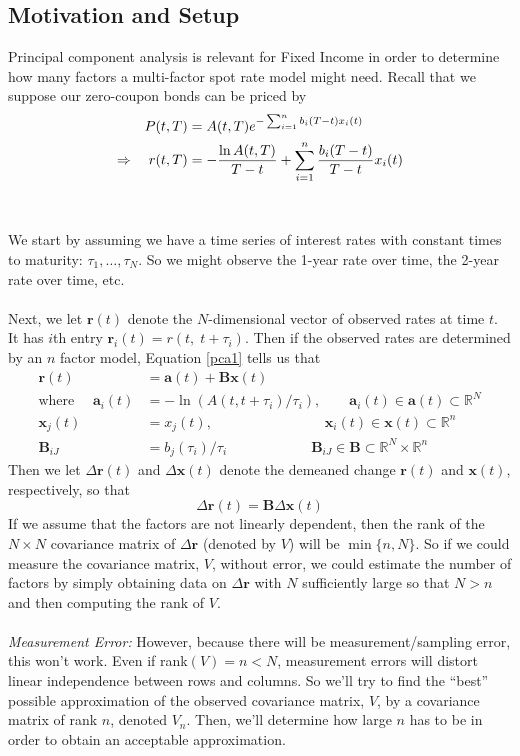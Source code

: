 \documentclass[a4paper,12pt]{scrartcl}
\begin{document}
\subsection{Motivation and Setup}
Principal component analysis is relevant for Fixed Income in 
order to determine how many factors a multi-factor spot rate
model might need. Recall that we suppose our zero-coupon bonds can
be priced by
\begin{align}
   \label{pca1}
   P(t,T) &= A(t,T) e^{-\sum^n_{i=1} b_i(T-t) x_i(t)} \notag\\
   \Rightarrow \quad r(t,T) &= -\frac{\ln A(t,T)}{T-t} + 
      \sum^n_{i=1} \frac{b_i(T-t)}{T-t} x_i(t)
\end{align}
\\
\\
We start by assuming  we have a time series of interest rates with
constant times to maturity: $\tau_1, \ldots, \tau_N$. So we might
observe the 1-year rate over time, the 2-year rate over time, etc.
\\
\\
Next, we let $\mathbf{r}(t)$ denote the $N$-dimensional vector of 
observed rates at time $t$. It has $i$th entry $\mathbf{r}_i(t) = 
r(t,\; t + \tau_i)$. Then if the observed rates are determined by
an $n$ factor model, Equation \ref{pca1} tells us that
\begin{align*}
   \mathbf{r}(t) &= \mathbf{a}(t) + \mathbf{B}\mathbf{x}(t)\\
   \text{where } \quad \mathbf{a}_i(t) &= -\ln \left( A(t,t+\tau_i)/
   \tau_i\right), \qquad \mathbf{a}_i(t) \in \mathbf{a}(t) \subset
      \mathbb{R}^N \\
   \mathbf{x}_j(t) &= x_j(t), \qquad \qquad \qquad\qquad
      \mathbf{x}_i(t)\in \mathbf{x}(t) \subset \mathbb{R}^n\\
   \mathbf{B}_{iJ} &= b_j(\tau_i)/\tau_i \qquad \qquad \qquad
   \mathbf{B}_{iJ} \in \mathbf{B} \subset \mathbb{R}^N \times 
      \mathbb{R}^n
\end{align*}
Then we let $\Delta \mathbf{r}(t)$ and $\Delta \mathbf{x}(t)$ denote
the demeaned change $\mathbf{r}(t)$ and $\mathbf{x}(t)$, respectively,
so that
\begin{equation}
   \label{pca2}
   \Delta \mathbf{r}(t) = \mathbf{B} \Delta \mathbf{x}(t)
\end{equation}
If we assume that the factors are not linearly dependent, then the
rank of the $N \times N$ covariance matrix of $\Delta \mathbf{r}$ 
(denoted by $V$) will be $\min\{ n, N\}$. So if we could measure 
the covariance matrix, $V$, without error, we could estimate
the number of factors by simply obtaining data on $\Delta \mathbf{r}$
with $N$ sufficiently large so that $N > n$ and then computing the rank
of $V$.
\\
\\
{\sl Measurement Error:} However, because there will be 
measurement/sampling error, this won't work. Even if rank$(V) = n < N$,
measurement errors will distort linear independence between rows and
columns. So we'll try to find the ``best'' possible approximation
of the observed covariance matrix, $V$, by a covariance matrix of
rank $n$, denoted $V_n$. Then, we'll determine how large $n$ 
has to be in order to obtain an acceptable approximation.
\end{document}
